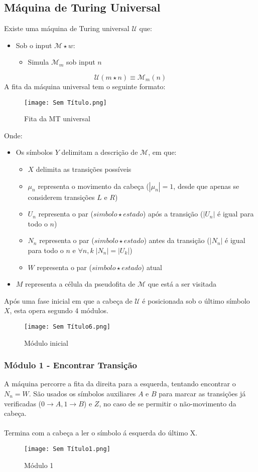 \documentclass[10pt,a4paper]{report}
\begin{document}
\subsection{Máquina de Turing Universal}
Existe uma máquina de Turing universal $\mathcal{U}$ que:
\begin{itemize}
\item Sob o input $\mathcal{M}\star w$:
\begin{itemize}
\item Simula $\mathcal{M}_m$ sob input $n$
\end{itemize}
\end{itemize}
$$
\mathcal{U}(m\star n) \equiv \mathcal{M}_m(n)
$$
A fita da máquina universal tem o seguinte formato:
\begin{figure}[H]
\centering
\texttt{[image: Sem Título.png]}
\caption{Fita da MT universal}
\end{figure}
Onde:
\begin{itemize}
\item Os símbolos $Y$ delimitam a descrição de $\mathcal{M}$, em que:
\begin{itemize}
\item $X$ delimita as transições possíveis
\item $\mu_n$ representa o movimento da cabeça ($|\mu_n| = 1$, desde que apenas se considerem transições $L$ e $R$)
\item $U_n$ representa o par ($simbolo \star estado$) após a transição ($|U_n|$ é igual para todo o $n$)
\item $N_n$ representa o par ($simbolo \star estado$) antes da transição ($|N_n|$ é igual para todo o $n$ e $\forall n, k \; |N_n| = |U_k|$)
\item $W$ representa o par ($simbolo \star estado$) atual
\end{itemize}
\item $M$ representa a célula da pseudofita de $\mathcal{M}$ que está a ser visitada
\end{itemize}
Após uma fase inicial em que a cabeça de $\mathcal{U}$ é posicionada sob o último símbolo $X$, esta opera segundo 4 módulos.
\begin{figure}[H]
\centering
\texttt{[image: Sem Título6.png]}
\caption{Módulo inicial}
\end{figure}
\subsubsection{Módulo 1 - Encontrar Transição}
A máquina percorre a fita da direita para a esquerda, tentando encontrar o $N_n = W$. São usados os símbolos auxiliares $A$ e $B$ para marcar as transições já verificadas ($0 \rightarrow A, 1 \rightarrow B$) e $Z$, no caso de se permitir o não-movimento da cabeça.\\
\\
Termina com a cabeça a ler o símbolo á esquerda do último X.
\begin{figure}[H]
\centering
\texttt{[image: Sem Título1.png]}
\caption{Módulo 1}
\end{figure}
\end{document}
